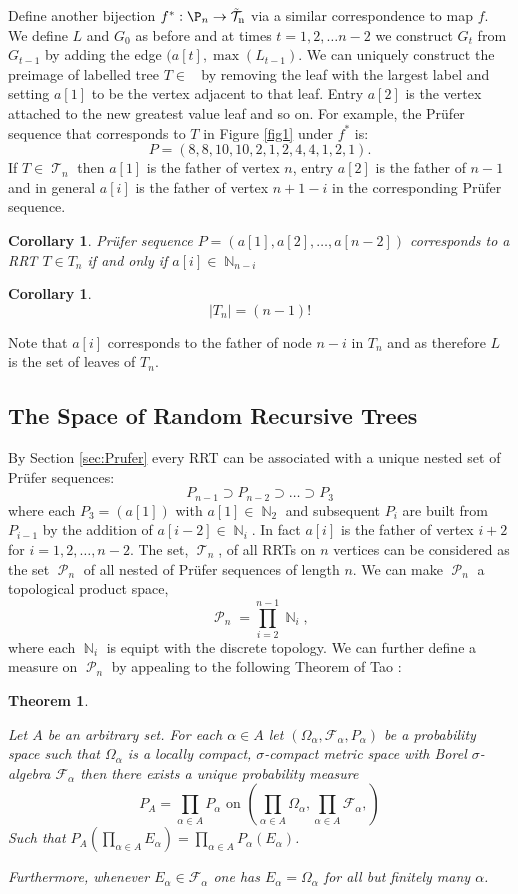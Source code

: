 \documentclass[oneside]{book} %
\newtheorem{theorem}{Theorem}
\newtheorem{cor}[thm]{Corollary}
\theoremstyle{definition}
\numberwithin{equation}{section}
\DeclareMathOperator{\T}{\mathcal{T}}
\DeclareMathOperator{\lT}{\tilde{\mathcal{T}}_n}
\DeclareMathOperator{\N}{\mathbb{N}}
\DeclareMathOperator{\Pruf}{\mathcal{P}} %
\begin{document}
Define another bijection $f^{*}: \P_n \rightarrow \lT$ via a similar correspondence to map $f$.  We define $L$ and $G_0$ as before and at times $t=1,2,\dots n-2$ we construct $G_t$ from $G_{t-1}$ by adding the edge $(a[t],\max(L_{t-1})$.  We can uniquely construct the preimage of labelled tree $T \in \lT$ by removing the leaf with the largest label and setting $a[1]$ to be the vertex adjacent to that leaf. Entry $a[2]$ is the vertex attached to the new greatest value leaf and so on.  For example, the Pr\"{u}fer sequence that corresponds to $T$ in Figure \ref{fig1} under $f^*$ is:
\[P = (8,8,10,10,2,1,2,4,4,1,2,1).\]
If $T\in \T_n$ then $a[1]$ is the father of vertex $n$, entry $a[2]$ is the father of $n-1$ and in general $a[i]$ is the father of vertex $n + 1-i$ in the corresponding Pr\"{u}fer sequence.
\begin{cor}
 Pr\"{u}fer sequence $P = (a[1],a[2],\dots,a[n-2])$ corresponds to a RRT $T \in T_n$ if and only if $a[i] \in \N_{n-i}$ 
\end{cor}

\begin{cor}
\[
 \lvert T_n \rvert  = (n-1)!
\]
\end{cor}
Note that $a[i]$ corresponds to the father of node $n-i$ in $T_n$ and as therefore $L$ is the set of leaves of $T_n$.  

\subsection{The Space of Random Recursive Trees}
By Section \ref{sec:Prufer} every RRT can be associated with a unique nested set of Pr\"{u}fer sequences:
\[P_{n-1} \supset P_{n-2} \supset \dots \supset P_3\]
where each $P_3 = (a[1])$ with $a[1] \in \N_2$ and subsequent $P_i$ are built from $P_{i-1}$ by the addition of $a[i-2] \in \N_{i}$.  In fact $a[i]$ is the father of vertex $i+2$ for $i = 1,2,\dots, n-2$.  The set, $\T_n$, of all RRTs on $n$ vertices can be considered as the set $\Pruf_n$ of all nested  of Pr\"{u}fer sequences of length $n$.  We can make $\Pruf_n$ a topological product space,
\[
 \Pruf_n = \prod_{i=2}^{n-1} \N_i,
\]
where each $\N_i$ is equipt with the discrete topology.  We can further define a measure on $\Pruf_n$ by appealing to the following Theorem of Tao \cite{Tao}:
\begin{theorem}\label{thm:tao}

 Let $A$ be an arbitrary set.  For each $\alpha \in A$ let $(\Omega_{\alpha},\mathcal{F}_\alpha,P_\alpha)$ be a probability space such that $\Omega_{\alpha}$ is a locally compact, $\sigma$-compact metric space with Borel $\sigma$-algebra $\mathcal{F}_{\alpha}$ then there exists a unique probability measure
 \[
  P_{A} = \prod_{\alpha \in A}P_\alpha \text{   on   } \left(\prod_{\alpha \in A}\Omega_\alpha, \prod_{\alpha \in A}\mathcal{F}_\alpha,\right)  
 \]
 Such that $P_A\left(\prod_{\alpha \in A}E_\alpha\right)  = \prod_{\alpha \in A} P_\alpha(E_\alpha)$.  
 
 Furthermore, whenever $E_\alpha \in \mathcal{F}_\alpha$ one has $E_\alpha = \Omega_{\alpha}$ for all but finitely many $\alpha$. 
\end{theorem}
\end{document}
